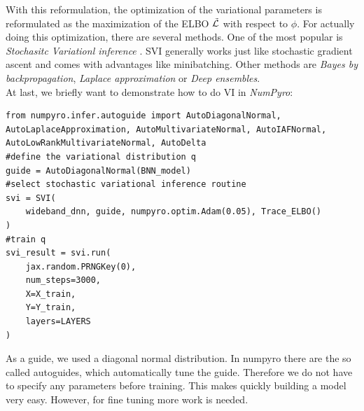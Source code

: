 \documentclass{article}
\begin{document}
With this reformulation, the optimization of the variational parameters is reformulated as the maximization of the ELBO $\Tilde{\mathcal{L}}$ with respect to $\phi$. For actually doing this optimization, there are several methods. One of the most popular is \textit{Stochasitc Variationl inference} \cite{hoffman2013stochasticvariationalinference}. SVI generally works just like stochastic gradient ascent \cite{BNNTut} and comes with advantages like minibatching. Other methods are \textit{Bayes by backpropagation}, \textit{Laplace approximation} or \textit{Deep ensembles}.\\
At last, we briefly want to demonstrate how to do VI in \textit{NumPyro}:
\begin{lstlisting}[caption= {Inference with VI},captionpos=t]
from numpyro.infer.autoguide import AutoDiagonalNormal, AutoLaplaceApproximation, AutoMultivariateNormal, AutoIAFNormal, AutoLowRankMultivariateNormal, AutoDelta
#define the variational distribution q
guide = AutoDiagonalNormal(BNN_model)
#select stochastic variational inference routine
svi = SVI(
    wideband_dnn, guide, numpyro.optim.Adam(0.05), Trace_ELBO()
)
#train q
svi_result = svi.run(
    jax.random.PRNGKey(0),
    num_steps=3000,
    X=X_train,
    Y=Y_train,
    layers=LAYERS
)
\end{lstlisting}
As a guide, we used a diagonal normal distribution. In numpyro there are the so called autoguides, which automatically tune the guide. Therefore we do not have to specify any parameters before training. This makes quickly building a model very easy. However, for fine tuning more work is needed.
\end{document}
